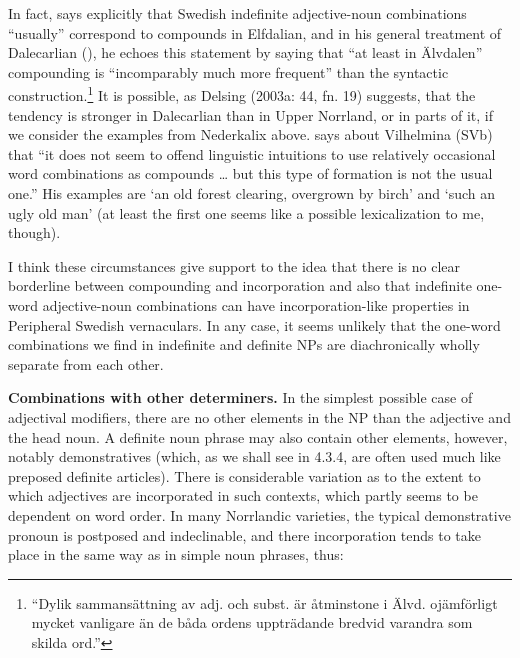 In fact, \citet[51]{Levander1909} says explicitly that Swedish indefinite adjective-noun combinations “usually” correspond to compounds in Elfdalian, and in his general treatment of Dalecarlian (\citet[142]{Levander1928}), he echoes this statement by saying that “at least in Älvdalen” compounding is “incomparably much more frequent” than the syntactic construction.\footnote{ “Dylik sammansättning av adj. och subst. är åtminstone i Älvd. ojämförligt mycket vanligare än de båda ordens uppträdande bredvid varandra som skilda ord.”} It is possible, as Delsing (2003a: 44, fn. 19) suggests, that the tendency is stronger in Dalecarlian than in Upper Norrland, or in parts of it, if we consider the examples from Nederkalix above. \citet[98]{Dahlstedt1962} says about Vilhelmina (SVb) that “it does not seem to offend linguistic intuitions to use relatively occasional word combinations as compounds … but this type of formation is not the usual one.” His examples are  ‘an old forest clearing, overgrown by birch’ and ‘such an ugly old man’ (at least the first one seems like a possible lexicalization to me, though). 


I think these circumstances give support to the idea that there is no clear borderline between compounding and incorporation and also that indefinite one-word adjective-noun combinations can have incorporation-like properties in Peripheral Swedish vernaculars. In any case, it seems unlikely that the one-word combinations we find in indefinite and definite NPs are diachronically wholly separate from each other.


\textbf{Combinations with other determiners. }In the simplest possible case of adjectival modifiers, there are no other elements in the NP than the adjective and the head noun. A definite noun phrase may also contain other elements, however, notably demonstratives (which, as we shall see in 4.3.4, are often used much like preposed definite articles). There is considerable variation as to the extent to which adjectives are incorporated in such contexts, which partly seems to be dependent on word order. In many Norrlandic varieties, the typical demonstrative pronoun is postposed and indeclinable, and there incorporation tends to take place in the same way as in simple noun phrases, thus:


